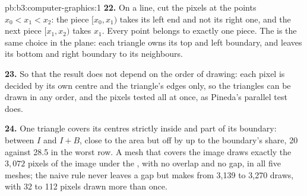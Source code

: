\begin{solution}{pb:b3:computer-graphics:1}
\textbf{22.} On a line, cut the pixels at the points $x_0 < x_1 < x_2$: the piece $[x_0, x_1)$ takes its left end and not its right one, and the next piece $[x_1, x_2)$ takes $x_1$. Every point belongs to exactly one piece. The  is the same choice in the plane: each triangle owns its top and left boundary, and leaves its bottom and right boundary to its neighbours.

\textbf{23.} So that the result does not depend on the order of drawing: each pixel is decided by its own centre and the triangle's edges only, so the triangles can be drawn in any order, and the pixels tested all at once, as Pineda's parallel test does.

\textbf{24.} One triangle covers its centres strictly inside and part of its boundary: between $I$ and $I + B$, close to the area but off by up to the boundary's share, 20 against 28.5 in the worst row. A mesh that covers the image draws exactly the $3{,}072$ pixels of the image under the , with no overlap and no gap, in all five meshes; the naive rule never leaves a gap but makes from 3,139 to 3,270 draws, with 32 to 112 pixels drawn more than once.
\end{solution}
